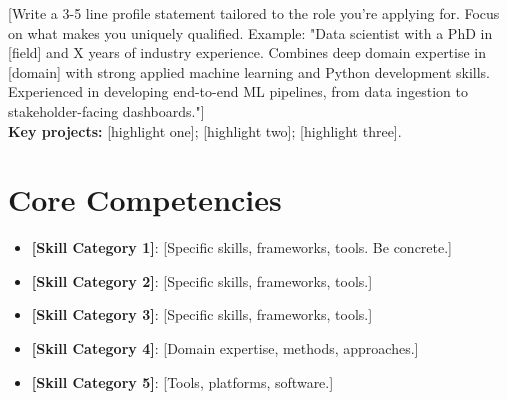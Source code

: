 \documentclass[11pt,a4paper,sans]{moderncv}
\begin{document}
\makecvtitle


\vspace{6pt}
\small{[Write a 3-5 line profile statement tailored to the role you're applying for. Focus on what makes you uniquely qualified. Example: "Data scientist with a PhD in [field] and X years of industry experience. Combines deep domain expertise in [domain] with strong applied machine learning and Python development skills. Experienced in developing end-to-end ML pipelines, from data ingestion to stakeholder-facing dashboards."]\\
\textbf{Key projects:} [highlight one]; [highlight two]; [highlight three].}


\section{Core Competencies}
\vspace{1pt}
\begin{itemize}

\item \textbf{[Skill Category 1]}: [Specific skills, frameworks, tools. Be concrete.]

\item \textbf{[Skill Category 2]}: [Specific skills, frameworks, tools.]

\item \textbf{[Skill Category 3]}: [Specific skills, frameworks, tools.]

\item \textbf{[Skill Category 4]}: [Domain expertise, methods, approaches.]

\item \textbf{[Skill Category 5]}: [Tools, platforms, software.]

\end{itemize}

\end{document}
